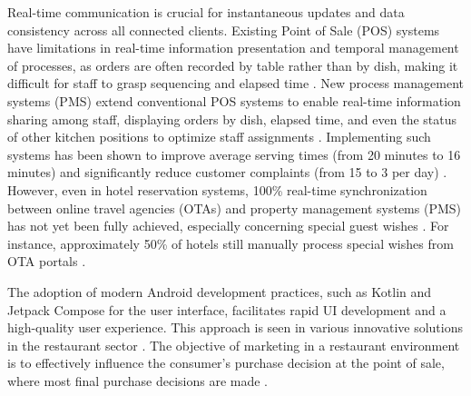 \documentclass{article}
\begin{document}
Real-time communication is crucial for instantaneous updates and data consistency across all connected clients. Existing Point of Sale (POS) systems have limitations in real-time information presentation and temporal management of processes, as orders are often recorded by table rather than by dish, making it difficult for staff to grasp sequencing and elapsed time \parencite{shimmura2009real}. New process management systems (PMS) extend conventional POS systems to enable real-time information sharing among staff, displaying orders by dish, elapsed time, and even the status of other kitchen positions to optimize staff assignments \parencite{shimmura2009real}. Implementing such systems has been shown to improve average serving times (from 20 minutes to 16 minutes) and significantly reduce customer complaints (from 15 to 3 per day) \parencite{shimmura2009real}. However, even in hotel reservation systems, 100\% real-time synchronization between online travel agencies (OTAs) and property management systems (PMS) has not yet been fully achieved, especially concerning special guest wishes \parencite{simunic2018level}. For instance, approximately 50\% of hotels still manually process special wishes from OTA portals \parencite{simunic2018level}.

The adoption of modern Android development practices, such as Kotlin and Jetpack Compose for the user interface, facilitates rapid UI development and a high-quality user experience. This approach is seen in various innovative solutions in the restaurant sector \parencite{buurman2024investigating}. The objective of marketing in a restaurant environment is to effectively influence the consumer's purchase decision at the point of sale, where most final purchase decisions are made \parencite{naranen2013pos}.
\end{document}
